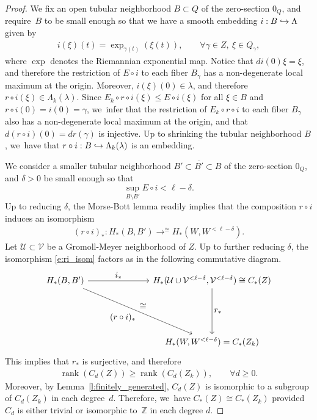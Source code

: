 \documentclass[JEP,XML,SOM,Unicode,NoFloatCountersInSection,published]{cedram}
\let\ts\textstyle
\newcommand\hto{\mathrel{\lhook\joinrel\to}}
\newcommand{\Z}{\mathbb{Z}}
\newcommand{\UU}{\mathcal{U}}
\newcommand{\VV}{\mathcal{V}}
\DeclareMathOperator{\rank}{rank}
\DeclareMathOperator*{\toup}{\longrightarrow}
\let\ttoup\toup
\theoremstyle{plain}
\theoremstyle{definition}
\begin{document}
\begin{proof}
We fix an open tubular neighborhood $B\subset Q$ of the zero-section $0_Q$, and require~$B$ to be small enough so that we have a smooth embedding $i:B\hto \Lambda$ given by
\begin{align*}
i(\xi)(t)=\exp_{\gamma(t)}(\xi(t)),\qquad\forall\gamma\in Z,\ \xi\in Q_\gamma,
\end{align*}
where $\exp$ denotes the Riemannian exponential map. Notice that $d i(0)\xi=\xi$, and therefore the restriction of $E\circ i$ to each fiber $B_\gamma$ has a non-degenerate local maximum at the origin.
Moreover, $i(\xi)(0)\in\lambda$, and therefore $r\circ i(\xi)\in\Lambda_k(\lambda)$.
Since $E_k\circ r\circ i(\xi)\leq E\circ i(\xi)$ for all $\xi\in B$ and $r\circ i(0)= i(0)=\gamma$, we~infer that the restriction of $E_k\circ r\circ i$ to each fiber $B_\gamma$ also has a non-degenerate local maximum at the origin, and that $d(r\circ i)(0)=dr(\gamma)$ is injective. Up to shrinking the tubular neighborhood $B$, we~have that $r\circ i:B\hto \Lambda_k(\lambda)$ is an embedding.

We consider a smaller tubular neighborhood $B'\subset \overline{B'}\subset B$ of the zero-section $0_Q$, and $\delta>0$ be small enough so that
\[
\sup_{B\setminus B'} E\circ i<\ell-\delta.
\]
Up to reducing $\delta$, the Morse-Bott lemma \cite[Lem.\,3.51]{Banyaga:2004aa} readily implies that the composition $r\circ i$ induces an isomorphism
\begin{align}
\label{e:ri_isom}
(r\circ i)_*:H_*(B,B')\ttoup^{\cong} H_*(W,W^{<\ell-\delta}).
\end{align}
Let $\UU\subset\VV$ be a Gromoll-Meyer neighborhood of $Z$. Up to further reducing $\delta$, the isomorphism \eqref{e:ri_isom} factors as in the following commutative diagram.
\[
\begin{tikzcd}[row sep=large]
H_*(B,B')
\arrow[rrr, "\ts i_*"]
\arrow[ddrrr, "\ts (r\circ i)_*"', "\ts\cong"]
& & &
H_*(\UU\cup\VV^{<\ell-\delta},\VV^{<\ell-\delta}) \cong C_*(Z)
\arrow[dd,"\ts r_*"]\\\\
& & &
H_*(W,W^{<\ell-\delta})=C_*(Z_k)
\end{tikzcd}
\]
This implies that $r_*$ is surjective, and therefore
\begin{align*}
\rank(C_d(Z))\geq \rank(C_d(Z_k)),\qquad\forall d\geq0.
\end{align*}
Moreover, by Lemma~\ref{l:finitely_generated}, $C_d(Z)$ is isomorphic to a subgroup of $C_d(Z_k)$ in each degree~$d$. Therefore, we~have $C_*(Z)\cong C_*(Z_k)$ provided $C_d$ is either trivial or isomorphic to~$\Z$ in each degree $d$.


\end{proof}
\end{document}
